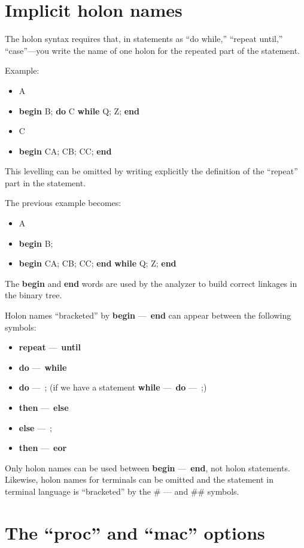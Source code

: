 \documentclass[openany,nobib]{tufte-book}
\newcommand{\kw}[1]{{\bf #1}}
\begin{document}
\section{Implicit holon names}

The holon syntax requires that, in statements as ``do while,'' ``repeat
until,'' ``case''---you write the name of one holon for the repeated part of
the statement.

Example:
\begin{itemize}
\setlength\itemsep{-0.3em}
    \item[] A
    \item[] \kw{begin} B; \kw{do} C \kw{while} Q; Z; \kw{end}
    \item[] C
    \item[] \kw{begin} CA; CB; CC; \kw{end}
\end{itemize}
This levelling can be omitted by writing explicitly the definition of the
``repeat'' part in the statement.

The previous example becomes:
\begin{itemize}
\setlength\itemsep{-0.3em}
    \item[] A
    \item[] \kw{begin} B;
    \item[] \quad\quad\quad \kw{do} \kw{begin} CA; CB; CC; \kw{end} \kw{while}
Q; Z; \kw{end}
\end{itemize}
The \kw{begin} and \kw{end} words are used by the analyzer to build correct
linkages in
the binary tree.

Holon names ``bracketed'' by \kw{begin} ---\ \kw{end} can appear between the
following
symbols:
\begin{itemize}
\setlength\itemsep{-0.2em}
    \item[] \kw{repeat} ---\ \kw{until}
    \item[] \kw{do} ---\ \kw{while}
    \item[] \kw{do} ---\ ; \qquad (if we have a statement \kw{while} ---\
\kw{do} ---\ ;)
    \item[] \kw{then} ---\ \kw{else}
    \item[] \kw{else} ---\ ;
    \item[] \kw{then} ---\ \kw{eor}
\end{itemize}
Only holon names can be used between \kw{begin} ---\ \kw{end}, not holon
statements.
Likewise, holon names for terminals can be omitted and the statement in
terminal language is ``bracketed'' by the \# --- and \#\# symbols.

\section{The ``proc'' and ``mac'' options}
\end{document}
